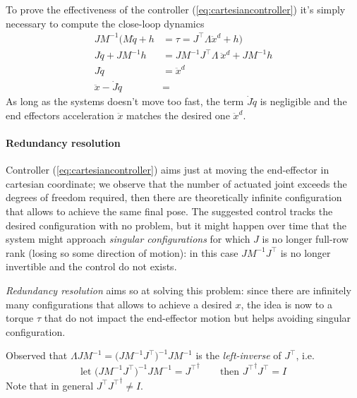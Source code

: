 	To prove the effectiveness of the controller (\ref{eq:cartesiancontroller}) it's simply necessary to compute the close-loop dynamics
	\begin{align*}
		JM^{-1} \Big( M \ddot q + h & = \tau = J^\top \Lambda \ddot x^d + h \Big) \\
		J \ddot q + JM^{-1} h & = JM^{-1}J^\top \Lambda \  \ddot x^d + JM^{-1} h \\
		J \ddot q & = \ddot x^d \\
		\ddot x - \dot J \dot q & =
	\end{align*}
	As long as the systems doesn't move too fast, the term $\dot J \dot q$ is negligible and the end effectors acceleration $\ddot x$ matches the desired one $\ddot x^d$.
	
	\paragraph{Redundancy resolution} Controller (\ref{eq:cartesiancontroller}) aims just at moving the end-effector in cartesian coordinate; we observe that the number of actuated joint exceeds the degrees of freedom required, then there are theoretically infinite configuration that allows to achieve the same final pose. The suggested control tracks the desired configuration with no problem, but it might happen over time that the system might approach \textit{singular configurations} for which $J$ is no longer full-row rank (losing so some direction of motion): in this case $JM^{-1}J^\top$ is no longer invertible and the control do not exists.
	
	\textit{Redundancy resolution} aims so at solving this problem: since there are infinitely many configurations that allows to achieve a desired $x$, the idea is now to a torque $\tau$ that do not impact the end-effector motion but helps avoiding singular configuration.
	
	Observed that $\Lambda JM^{-1} = \big(JM^{-1}J^\top\big)^{-1}JM^{-1}$ is the \textit{left-inverse} of $J^\top$, i.e. 
	\[ \textrm{let } \big(JM^{-1}J^\top\big)^{-1}JM^{-1} = {J^\top}^\dagger \qquad \textrm{then } {J^\top}^\dagger J^\top = I \]
	Note that in general $J^\top {J^\top}^\dagger \neq I$.
	
